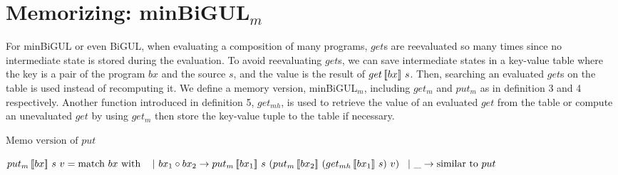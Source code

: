 \section{Memorizing: minBiGUL$_m$}

For minBiGUL or even BiGUL, when evaluating a composition of many programs, $get$s are reevaluated so many times since no intermediate state is stored during the evaluation. To avoid reevaluating $get$s, we can save intermediate states in a key-value table where the key is a pair of the program $bx$ and the source $s$, and the value is the result of $get \, [\![bx]\!] \ s$. Then, searching an evaluated $get$s on the table is used instead of recomputing it. We define a memory version, minBiGUL$_m$, including $get_m$ and $put_m$ as in definition 3 and 4 respectively. Another function introduced in definition 5, $get_{mh}$, is used to retrieve the value of an evaluated $get$ from the table or compute an unevaluated $get$ by using $get_m$ then store the key-value tuple to the table if necessary.

\begin{definition} $\text{Memo version of } put$

    \noindent $\putm{bx}{s}{v} = \text{match } bx \text{ with }\\
        \tab \vert \ bx_1 \circ bx_2 \to \putm{bx_1}{s}{(\putm{bx_2}{(\getmh{bx_1}{s})}{v})} \\
        \tab \vert \ \_ \to \text{similar to } put$
\end{definition}

